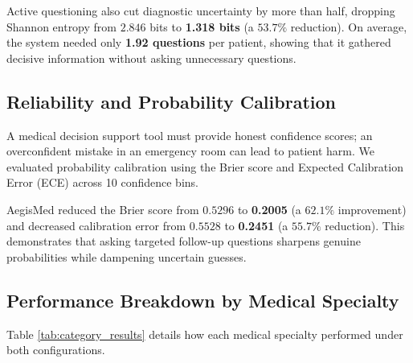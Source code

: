 \documentclass[10pt,twocolumn]{article}
\begin{document}
Active questioning also cut diagnostic uncertainty by more than half, dropping Shannon entropy from $2.846$ bits to \textbf{1.318 bits} (a $53.7\%$ reduction). On average, the system needed only \textbf{1.92 questions} per patient, showing that it gathered decisive information without asking unnecessary questions.

\subsection{Reliability and Probability Calibration}
A medical decision support tool must provide honest confidence scores; an overconfident mistake in an emergency room can lead to patient harm. We evaluated probability calibration using the Brier score \cite{brier1950verification} and Expected Calibration Error (ECE) across 10 confidence bins.

AegisMed reduced the Brier score from $0.5296$ to \textbf{0.2005} (a $62.1\%$ improvement) and decreased calibration error from $0.5528$ to \textbf{0.2451} (a $55.7\%$ reduction). This demonstrates that asking targeted follow-up questions sharpens genuine probabilities while dampening uncertain guesses.

\subsection{Performance Breakdown by Medical Specialty}
Table \ref{tab:category_results} details how each medical specialty performed under both configurations.

\begin{table}[t]
\centering
\footnotesize
\caption{\textbf{Top-1 Accuracy Across Medical Specialties ($N = 200$).}}
\label{tab:category_results}
\end{table}
\end{document}
